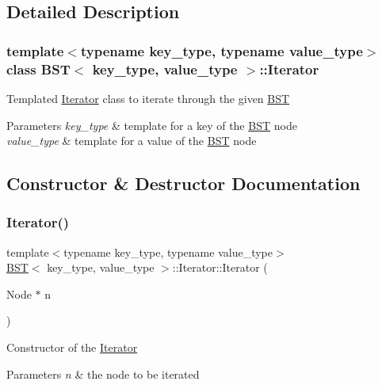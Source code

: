 \subsection{Detailed Description}
\subsubsection*{template$<$typename key\+\_\+type, typename value\+\_\+type$>$\newline
class B\+S\+T$<$ key\+\_\+type, value\+\_\+type $>$\+::\+Iterator}

Templated \mbox{\hyperlink{class_b_s_t_1_1_iterator}{Iterator}} class to iterate through the given \mbox{\hyperlink{class_b_s_t}{B\+ST}} 
\begin{DoxyParams}{Parameters}
{\em key\+\_\+type} & template for a key of the \mbox{\hyperlink{class_b_s_t}{B\+ST}} node \\
\hline
{\em value\+\_\+type} & template for a value of the \mbox{\hyperlink{class_b_s_t}{B\+ST}} node \\
\hline
\end{DoxyParams}


\subsection{Constructor \& Destructor Documentation}
\mbox{\label{class_b_s_t_1_1_iterator_af7bc2cb09f5e0e7c94ec2074c1ac1982}} 
\subsubsection{\texorpdfstring{Iterator()}{Iterator()}}
{\footnotesize\ttfamily template$<$typename key\+\_\+type, typename value\+\_\+type$>$ \\
\mbox{\hyperlink{class_b_s_t}{B\+ST}}$<$ key\+\_\+type, value\+\_\+type $>$\+::Iterator\+::\+Iterator (\begin{DoxyParamCaption}\item[{Node $\ast$}]{n }\end{DoxyParamCaption})\hspace{0.3cm}{\ttfamily [inline]}}

Constructor of the \mbox{\hyperlink{class_b_s_t_1_1_iterator}{Iterator}} 
\begin{DoxyParams}{Parameters}
{\em n} & the node to be iterated \\
\hline
\end{DoxyParams}


